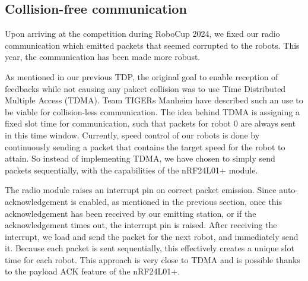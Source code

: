 \subsection{Collision-free communication}
Upon arriving at the competition during RoboCup 2024, we fixed our radio communication
which emitted packets that seemed corrupted to the robots. This year, the communication has been made more
robust.

As mentioned in our previous TDP, the original goal to enable reception of feedbacks while not causing any 
pakcet collision was to use Time Distributed Multiple Access (TDMA). Team TIGERs Manheim have described such an use \cite{tigers_tdp_2020}
to be viable for collision-less communication. The idea behind TDMA is assigning a fixed slot time
for communication, such that packets for robot 0 are always sent in this time window.
Currently, speed control of our robots is done by continuously sending a packet
that contains the target speed for the robot to attain. So instead of implementing
TDMA, we have chosen to simply send packets sequentially,
with the capabilities of the nRF24L01+ module.


The radio module raises an interrupt pin on correct packet emission. Since auto-acknowledgement is enabled, 
as mentioned in the previous section, once this acknowledgement has been received by our emitting station,
or if the acknowledgement times out, the interrupt pin is raised.
After receiving the interrupt, we load and send the packet for the next robot, and immediately send it.
Because each packet is sent sequentially, this effectively creates a unique slot time for each robot.
This approach is very close to TDMA and is possible thanks to the payload ACK feature of the nRF24L01+.